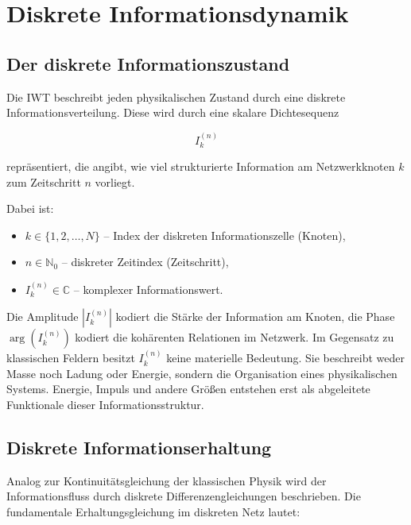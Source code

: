 
\chapter{Diskrete Informationsdynamik}
\label{ch:diskrete_informationsdynamik}

\section{Der diskrete Informationszustand}
\label{sec:diskreter_informationszustand}

Die IWT beschreibt jeden physikalischen Zustand durch eine diskrete Informationsverteilung. Diese wird durch eine skalare Dichtesequenz

\[
I_k^{(n)}
\]

repräsentiert, die angibt, wie viel strukturierte Information am Netzwerkknoten \( k \) zum Zeitschritt \( n \) vorliegt.

Dabei ist:

\begin{itemize}
    \item \( k \in \{1, 2, \dots, N\} \) – Index der diskreten Informationszelle (Knoten),
    \item \( n \in \mathbb{N}_0 \) – diskreter Zeitindex (Zeitschritt),
    \item \( I_k^{(n)} \in \mathbb{C} \) – komplexer Informationswert.
\end{itemize}

Die Amplitude \( |I_k^{(n)}| \) kodiert die Stärke der Information am Knoten, die Phase \( \arg(I_k^{(n)}) \) kodiert die kohärenten Relationen im Netzwerk. Im Gegensatz zu klassischen Feldern besitzt \( I_k^{(n)} \) keine materielle Bedeutung. Sie beschreibt weder Masse noch Ladung oder Energie, sondern die Organisation eines physikalischen Systems. Energie, Impuls und andere Größen entstehen erst als abgeleitete Funktionale dieser Informationsstruktur.

\section{Diskrete Informationserhaltung}
\label{sec:diskrete_informationserhaltung}

Analog zur Kontinuitätsgleichung der klassischen Physik wird der Informationsfluss durch diskrete Differenzengleichungen beschrieben. Die fundamentale Erhaltungsgleichung im diskreten Netz lautet:

